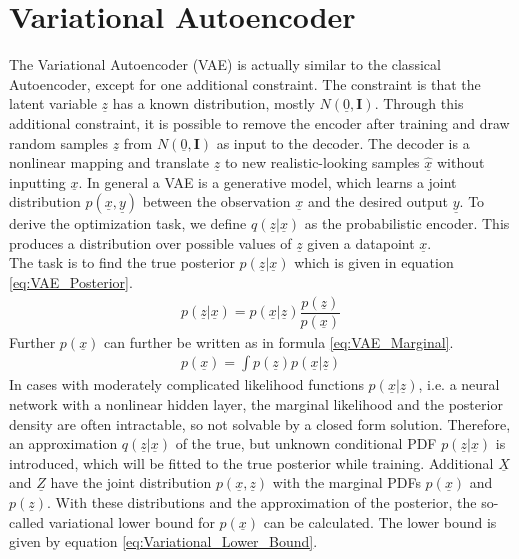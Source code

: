 \documentclass[12pt,DIV14,BCOR12mm,a4paper,footexclude,headinclude,halfparskip-,twoside,openright,openany,cleardoubleempty,idxtotoc,bibtotoc]{scrreprt} %
\numberwithin{equation}{chapter}
\begin{document}
\section{Variational Autoencoder}
The Variational Autoencoder (VAE) is actually similar to the classical Autoencoder, except for one additional constraint. The constraint is that the latent variable $\underline{z}$ has a known distribution, mostly $N(\underline{0}, \mathbf{I})$. Through this additional constraint, it is possible to remove the encoder after training and draw random samples $\underline{z}$ from $N(\underline{0}, \mathbf{I})$ as input to the decoder. The decoder is a nonlinear mapping and translate $\underline{z}$ to new realistic-looking samples $\hat{\underline{x}}$ without inputting $\underline{x}$. In general a VAE is a generative model, which learns a joint distribution $p(\underline{x},\underline{y})$ between the observation $\underline{x}$ and the desired output $\underline{y}$. To derive the optimization task, we define $q(\underline{z}|\underline{x})$ as the probabilistic encoder. This produces a distribution over possible values of $\underline{z}$ given a datapoint $\underline{x}$.\\
The task is to find the true posterior $p(\underline{z}|\underline{x})$ which is given in equation \ref{eq:VAE_Posterior}.
\begin{align}
	 p(\underline{z}|\underline{x}) = p(\underline{x}|\underline{z})\dfrac{p(\underline{z})}{p(\underline{x})}\label{eq:VAE_Posterior}
\end{align}
Further $p(\underline{x})$ can further be written as in formula \ref{eq:VAE_Marginal}.
\begin{align}
	 p(\underline{x}) = \int p(\underline{z})p(\underline{x}|\underline{z})\label{eq:VAE_Marginal}
\end{align}
In cases with moderately complicated likelihood functions $p(\underline{x}|\underline{z})$, i.e. a neural network with a nonlinear hidden layer, the marginal likelihood and the posterior density are often intractable, so not solvable by a closed form solution. Therefore, an approximation $q(\underline{z}|\underline{x})$ of the true, but unknown conditional PDF $p(\underline{z}|\underline{x})$ is introduced, which will be fitted to the true posterior while training. Additional $\underline{X}$ and $\underline{Z}$ have the joint distribution $p(\underline{x},\underline{z})$ with the marginal PDFs $p(\underline{x})$ and $p(\underline{z})$. With these distributions and the approximation of the posterior, the so-called variational lower bound for $p(\underline{x})$ can be calculated. The lower bound is given by equation \ref{eq:Variational_Lower_Bound}.
\end{document}
